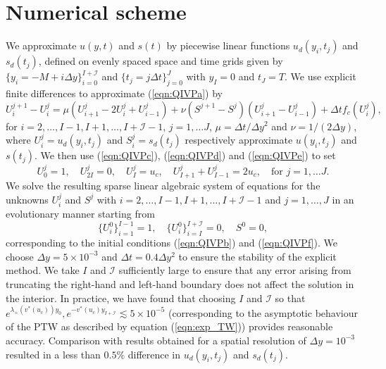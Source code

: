 \documentclass[11pt,a4paper]{article}
\newcommand{\eeref}[1]{(\ref{eqn:#1})}
\newcommand{\sslab}[1]{\label{sec:#1}}
\def\beq{\begin{equation}}
\def\eeq{\end{equation}}
\begin{document}
\section{Numerical scheme} \sslab{Numerical scheme}
We approximate $u(y,t)$ and $s(t)$ by piecewise linear functions 
$u_d(y_i,t_j)$ and  $s_d(t_j)$, 
defined on  evenly spaced  space and time grids given by 
$\{y_i =  - M + i \Delta y\}_{i=0}^{I+\mathcal{I}}$
and $\{t_j = j \Delta t\}_{j=0}^J$  
with $y_I=0$ and $t_J=T$. 
We use explicit finite differences to approximate \eeref{QIVPa} by
\beq
U_i^{j+1} - U_i^{j} = \mu \left( U_{i+1}^{j} - 2U_i^{j}+  U_{i-1}^j  \right)  + \nu\left(  S^{j+1} -  S^{j}  \right) \left(   U_{i+1}^{j} -  U_{i-1}^j  \right) 
 +  \Delta t f_c(U_i^{j}), 
\eeq
 for $i=2,\ldots,I-1,I+1,\ldots,I+\mathcal{I}-1$, 
$j=1,\ldots J$, $\mu=\Delta t/ \Delta y^2$ and $\nu=1/(2\Delta y)$, where $U_i^j=u_d(y_i,t_j)$ and $S_i^j=s_d(t_j)$ respectively approximate
  $u(y_i,t_j)$ and $s(t_j)$.
We then use \eeref{QIVPc}, \eeref{QIVPd} and \eeref{QIVPe}
to set
\beq
U^j_0=1,\quad U^j_{2I}=0, \quad U^j_I =u_c, \quad
U^j_{I+1}+ U^j_{I-1} = 2u_c, \quad\text{for $j=1,\ldots J$}.
\eeq
%
We solve the resulting  sparse linear algebraic system of equations 
for the unknowns 
 $U_i^j$ and $S^j$ with $i=2,\ldots,I-1,I+1,\ldots,I+\mathcal{I}-1$
 and $j=1,\ldots,J$
 in an evolutionary manner starting  from 
 \beq
 \{U^0_i\}_{i=1}^{I-1}=1,\quad \{U^0_{i}\}_{i=I}^{I+\mathcal{I}}=0,   \quad
 S^0 = 0, 
 \eeq
corresponding to the initial conditions \eeref{QIVPb} and \eeref{QIVPf}.
%
  We choose $\Delta y=5\times 10^{-3}$  and $\Delta t  = 0.4 \Delta y^2$ to ensure the  stability of the explicit method. 
  We 
   take $I$ and $\mathcal{I}$ sufficiently large 
%
   to ensure that
  any error arising from truncating the right-hand and left-hand boundary does not affect the solution in the interior. 
   In practice, we have found that choosing
   $I$ and $\mathcal{I}$ so that $e^{\lambda_+( v^*(u_c))y_0}, e^{- v^*(u_c)y_{I+\mathcal{I}}} \lesssim  5\times 10^{-5}$
   (corresponding to the asymptotic behaviour of the PTW as described by equation \eeref{exp_TW})
	provides   reasonable
	 accuracy.
%
 Comparison with results obtained for a spatial resolution of $\Delta y= 10^{-3}$ resulted in a less than $0.5\%$ difference in $u_d(y_i,t_j)$ and $s_d(t_j)$.
%
 
 

 
 
\end{document}
